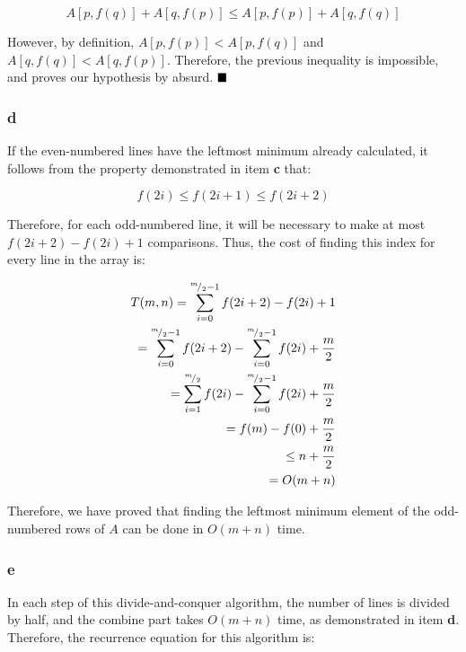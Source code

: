 \documentclass[8pt,a4paper]{article}
\begin{document}
\begin{equation*}
  A[p, f(q)] + A[q, f(p)] \leq A[p, f(p)] + A[q, f(q)]
\end{equation*}

  However, by definition, $A[p, f(p)] < A[p, f(q)]$ and $A[q, f(q)] < A[q, f(p)]$.
Therefore, the previous inequality is impossible, and proves our hypothesis by absurd.
$\qed$

\subsubsection*{d}

  If the even-numbered lines have the leftmost minimum already calculated, it follows
from the property demonstrated in item \textbf{c} that:

\begin{equation*}
  f(2i) \leq f(2i + 1) \leq f(2i + 2)
\end{equation*}

  Therefore, for each odd-numbered line, it will be necessary to make at most
$f(2i + 2) - f(2i) + 1$ comparisons. Thus, the cost of finding this index for
every line in the array is:

\begin{equation*}
  \begin{split}
    T(m, n) = \sum\limits_{i = 0}^{{}^{m}\!/_{2} - 1} f(2i+2) - f(2i) + 1 \\
    = \sum\limits_{i = 0}^{{}^{m}\!/_{2} - 1} f(2i + 2) - \sum\limits_{i = 0}^{{}^{m}\!/_{2} - 1} f(2i) + \frac{m}{2} \\
    = \sum\limits_{i = 1}^{{}^{m}\!/_{2}} f(2i) - \sum\limits_{i = 0}^{{}^{m}\!/_{2} - 1} f(2i) + \frac{m}{2} \\
    = f(m) - f(0) + \frac{m}{2} \\
    \leq n + \frac{m}{2} \\
    = O(m + n)
  \end{split}
\end{equation*}

  Therefore, we have proved that finding the leftmost minimum element of the
odd-numbered rows of $A$ can be done in $O(m + n)$ time.

\subsubsection*{e}

  In each step of this divide-and-conquer algorithm, the number of lines is
divided by half, and the combine part takes $O(m + n)$ time, as demonstrated in
item \textbf{d}. Therefore, the recurrence equation for this algorithm is:
\end{document}
